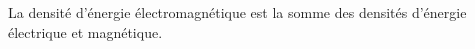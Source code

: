﻿\documentclass[a4paper]{article}
\begin{document}
\pagestyle{fancy}
\fancyhf{}
\setlength{\headheight}{15pt}

\begin{center}
	\large{}
\end{center}


La densité d'énergie électromagnétique est la somme des densités d'énergie électrique et magnétique.
\begin{center}
\end{center}
\end{document}
